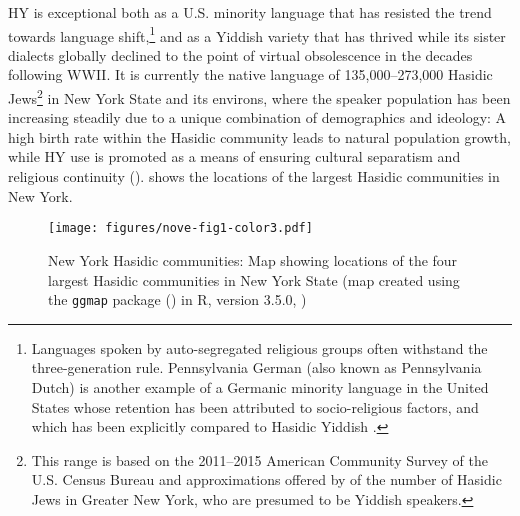 \documentclass[output=paper]{langsci/langscibook}
\begin{document}
HY is exceptional both as a U.S. minority language that has resisted the trend towards language shift,\footnote{Languages spoken by auto-segregated religious groups often withstand the three-generation rule. Pennsylvania German (also known as Pennsylvania Dutch) is another example of a Germanic minority language in the United States whose retention has been attributed to socio-religious factors, and which has been explicitly compared to Hasidic Yiddish \citep{Louden2016}.} and as a Yiddish variety that has thrived while its sister dialects globally declined to the point of virtual obsolescence in the decades following WWII. It is currently the native language of 135,000--273,000 Hasidic Jews\footnote{This range is based on the 2011--2015 American Community Survey of the U.S. Census Bureau \citep{MansonEtAl2017} and approximations offered by \citet{BialeEtAl2018} of the number of Hasidic Jews in Greater New York, who are presumed to be Yiddish speakers.} in New York State and its environs, where the speaker population has been increasing steadily due to a unique combination of demographics and ideology: A high birth rate within the Hasidic community leads to natural population growth, while HY use is promoted as a means of ensuring cultural separatism and religious continuity (\citealt{Fader2009, Fishman1965Yiddish,Glinert1999,Shandler2006}).  shows the locations of the largest Hasidic communities in New York. 

\begin{figure}
\texttt{[image: figures/nove-fig1-color3.pdf]}
\caption{New York Hasidic communities: Map showing locations of the four largest Hasidic communities in New York State (map created using the \texttt{ggmap} package (\citealt{KahleWickham2013}) in R, version 3.5.0, \citealt{RCore2017})}\label{fig:nove:1}
\end{figure}
\end{document}

